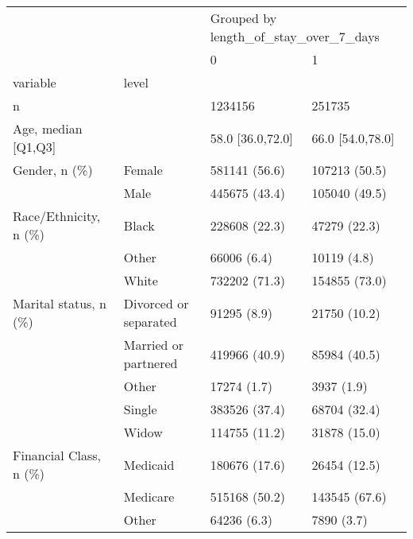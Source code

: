 \begin{tabular}{llll}
\toprule
                                       &   & \multicolumn{2}{l}{Grouped by length\_of\_stay\_over\_7\_days} \\
                                       &   &                                     0 &                 1 \\
variable & level &                                       &                   \\
\midrule
n &   &                               1234156 &            251735 \\
Age, median [Q1,Q3] &   &                      58.0 [36.0,72.0] &  66.0 [54.0,78.0] \\
Gender, n (\%) & Female &                         581141 (56.6) &     107213 (50.5) \\
                                       & Male &                         445675 (43.4) &     105040 (49.5) \\
Race/Ethnicity, n (\%) & Black &                         228608 (22.3) &      47279 (22.3) \\
                                       & Other &                           66006 (6.4) &       10119 (4.8) \\
                                       & White &                         732202 (71.3) &     154855 (73.0) \\
Marital status, n (\%) & Divorced or separated &                           91295 (8.9) &      21750 (10.2) \\
                                       & Married or partnered &                         419966 (40.9) &      85984 (40.5) \\
                                       & Other &                           17274 (1.7) &        3937 (1.9) \\
                                       & Single &                         383526 (37.4) &      68704 (32.4) \\
                                       & Widow &                         114755 (11.2) &      31878 (15.0) \\
Financial Class, n (\%) & Medicaid &                         180676 (17.6) &      26454 (12.5) \\
                                       & Medicare &                         515168 (50.2) &     143545 (67.6) \\
                                       & Other &                           64236 (6.3) &        7890 (3.7) \\

\end{tabular}
